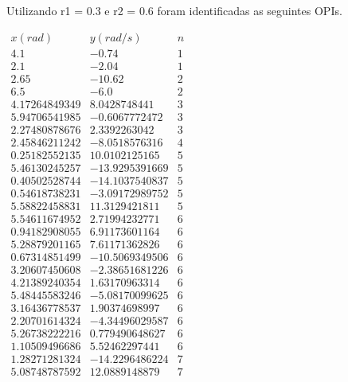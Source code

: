

Utilizando r1 = 0.3 e r2 = 0.6 foram identificadas as seguintes OPIs.
\\

\begin{center}
$\begin{array}{ccc}
	x(rad)        & y(rad/s)      & n \\  
	4.1 & -0.74 &  1\\ 
	2.1 & -2.04 &  1\\ 
	2.65 & -10.62 &  2\\ 
	6.5 & -6.0 &  2\\ 
	4.17264849349 &  8.0428748441 &  3\\ 
	5.94706541985 & -0.6067772472 &  3\\ 
	2.27480878676 &  2.3392263042 &  3\\ 
	2.45846211242 & -8.0518576316 &  4\\ 
	0.25182552135 &  10.0102125165 &  5\\ 
	5.46130245257 & -13.9295391669&  5\\ 
	0.40502528744 & -14.1037540837&  5\\ 
	0.54618738231 &  -3.09172989752&  5\\ 
	5.58822458831 &  11.3129421811&  5\\ 
	5.54611674952 &  2.71994232771&  6\\ 
	0.94182908055 &  6.91173601164&  6\\ 
	5.28879201165 &  7.61171362826&  6\\ 
	0.67314851499 &  -10.5069349506&  6\\ 
	3.20607450608 &  -2.38651681226&  6\\ 
	4.21389240354 &  1.63170963314&  6\\ 
	5.48445583246 &  -5.08170099625&  6\\ 
	3.16436778537 &  1.90374698997&  6\\ 
	2.20701614324 &  -4.34496029587&  6\\ 
	5.26738222216 &  0.779490648627&  6\\ 
	1.10509496686 &  5.52462297441&  6\\ 
	1.28271281324 &  -14.2296486224&  7\\ 
	5.08748787592 &  12.0889148879& 7
\end{array}$ 
\end{center}

